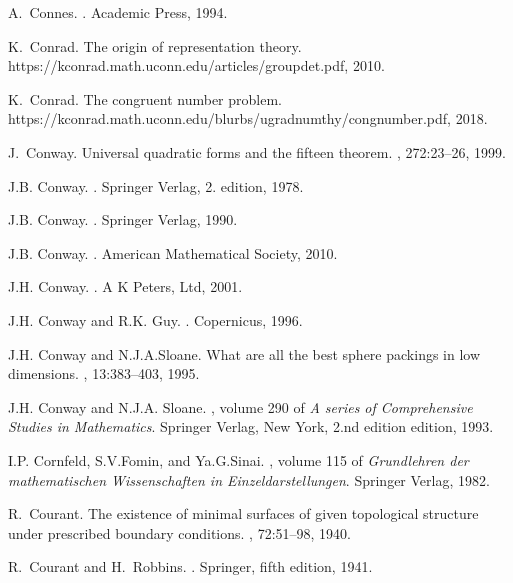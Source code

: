 \documentclass[12pt]{amsart}
\begin{document}
\begin{thebibliography}{100}
A.~Connes.
.
\newblock Academic Press, 1994.

K.~Conrad.
\newblock The origin of representation theory.
\newblock https://kconrad.math.uconn.edu/articles/groupdet.pdf, 2010.

K.~Conrad.
\newblock The congruent number problem.
\newblock https://kconrad.math.uconn.edu/blurbs/ugradnumthy/congnumber.pdf,
  2018.

J.~Conway.
\newblock Universal quadratic forms and the fifteen theorem.
, 272:23--26, 1999.

J.B. Conway.
.
\newblock Springer Verlag, 2. edition, 1978.

J.B. Conway.
.
\newblock Springer Verlag, 1990.

J.B. Conway.
.
\newblock American Mathematical Society, 2010.

J.H. Conway.
.
\newblock A K Peters, Ltd, 2001.

J.H. Conway and R.K. Guy.
.
\newblock Copernicus, 1996.

J.H. Conway and N.J.A.Sloane.
\newblock What are all the best sphere packings in low dimensions.
, 13:383--403, 1995.

J.H. Conway and N.J.A. Sloane.
, volume 290 of {\em A
  series of Comprehensive Studies in Mathematics}.
\newblock Springer Verlag, New York, 2.nd edition edition, 1993.

I.P. Cornfeld, S.V.Fomin, and Ya.G.Sinai.
, volume 115 of {\em {Grundlehren} der
  mathematischen {Wissenschaften} in {Einzeldarstellungen}}.
\newblock Springer Verlag, 1982.

R.~Courant.
\newblock The existence of minimal surfaces of given topological structure
  under prescribed boundary conditions.
, 72:51--98, 1940.

R.~Courant and H.~Robbins.
.
\newblock Springer, fifth edition, 1941.


\end{thebibliography}
\end{document}
